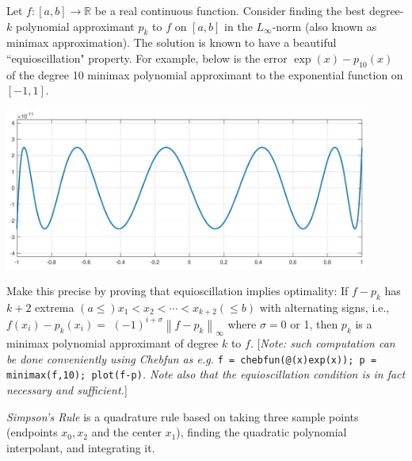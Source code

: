 \documentclass[answers]{exam}
\begin{document}
\begin{questions}
\question%
Let $f:[a, b] \to \mathbb{R}$ be a real continuous function. Consider finding the best degree-$k$ polynomial approximant $p_{k}$ to $f$ on $[a, b]$ in the $L_{\infty}$-norm (also known as minimax approximation). The solution is known to have a beautiful ``equioscillation" property. For example, below is the error $\exp (x)-p_{10}(x)$ of the degree 10 minimax polynomial approximant to the exponential function on $[-1,1]$.
\begin{center}\includegraphics[width=12cm]{sheet 3 q 8}\end{center}
Make this precise by proving that equioscillation implies optimality: If $f-p_{k}$ has $k+2$ extrema $(a \leq)x_{1}<x_{2}<\cdots<x_{k+2}(\leq b)$ with alternating signs, i.e., $f\left(x_{i}\right)-p_{k}\left(x_{i}\right)=$ $(-1)^{i+\sigma}\left\|f-p_{k}\right\|_{\infty}$ where $\sigma=0$ or 1, then $p_{k}$ is a minimax polynomial approximant of degree $k$ to $f$. [\emph{Note: such computation can be done conveniently using Chebfun as e.g.} \verb|f = chebfun(@(x)exp(x)); p = minimax(f,10); plot(f-p)|\emph{. Note also that the equioscillation condition is in fact necessary and sufficient.}]



\question%
\emph{Simpson's Rule} is a quadrature rule based on taking three sample points (endpoints $x_{0}, x_{2}$ and the center $x_{1}$), finding the quadratic polynomial interpolant, and integrating it.




\end{questions}
\end{document}
